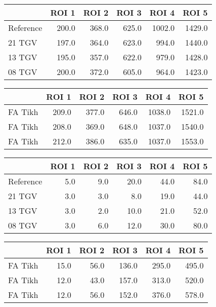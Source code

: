 \begin{tabular}{lrrrrr}
\toprule
{} &  ROI 1 &  ROI 2 &  ROI 3 &   ROI 4 &   ROI 5 \\
\midrule
Reference &  200.0 &  368.0 &  625.0 &  1002.0 &  1429.0 \\
21 TGV    &  197.0 &  364.0 &  623.0 &   994.0 &  1440.0 \\
13 TGV    &  195.0 &  357.0 &  622.0 &   979.0 &  1428.0 \\
08 TGV    &  200.0 &  372.0 &  605.0 &   964.0 &  1423.0 \\
\bottomrule
\end{tabular}
\begin{tabular}{lrrrrr}
\toprule
{} &  ROI 1 &  ROI 2 &  ROI 3 &   ROI 4 &   ROI 5 \\
\midrule
FA Tikh &  209.0 &  377.0 &  646.0 &  1038.0 &  1521.0 \\
FA Tikh &  208.0 &  369.0 &  648.0 &  1037.0 &  1540.0 \\
FA Tikh &  212.0 &  386.0 &  635.0 &  1037.0 &  1553.0 \\
\bottomrule
\end{tabular}
\begin{tabular}{lrrrrr}
\toprule
{} &  ROI 1 &  ROI 2 &  ROI 3 &  ROI 4 &  ROI 5 \\
\midrule
Reference &    5.0 &    9.0 &   20.0 &   44.0 &   84.0 \\
21 TGV    &    3.0 &    3.0 &    8.0 &   19.0 &   44.0 \\
13 TGV    &    3.0 &    2.0 &   10.0 &   21.0 &   52.0 \\
08 TGV    &    3.0 &    6.0 &   12.0 &   30.0 &   80.0 \\
\bottomrule
\end{tabular}
\begin{tabular}{lrrrrr}
\toprule
{} &  ROI 1 &  ROI 2 &  ROI 3 &  ROI 4 &  ROI 5 \\
\midrule
FA Tikh &   15.0 &   56.0 &  136.0 &  295.0 &  495.0 \\
FA Tikh &   12.0 &   43.0 &  157.0 &  313.0 &  520.0 \\
FA Tikh &   12.0 &   56.0 &  152.0 &  376.0 &  578.0 \\
\bottomrule
\end{tabular}
